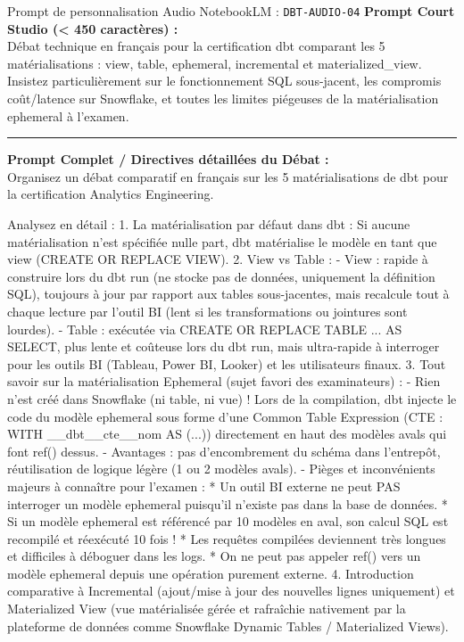 \documentclass[11pt,a4paper]{article}
\begin{document}
\begin{promptbox}{Prompt de personnalisation Audio NotebookLM : \texttt{DBT-AUDIO-04}}
\textbf{Prompt Court Studio (< 450 caractères) :}\\
Débat technique en français pour la certification dbt comparant les 5 matérialisations : view, table, ephemeral, incremental et materialized\_view. Insistez particulièrement sur le fonctionnement SQL sous-jacent, les compromis coût/latence sur Snowflake, et toutes les limites piégeuses de la matérialisation ephemeral à l'examen.

\medskip\hrule\medskip
\textbf{Prompt Complet / Directives détaillées du Débat :}\\
Organisez un débat comparatif en français sur les 5 matérialisations de dbt pour la certification Analytics Engineering.

Analysez en détail :
1. La matérialisation par défaut dans dbt :
Si aucune matérialisation n'est spécifiée nulle part, dbt matérialise le modèle en tant que view (CREATE OR REPLACE VIEW).
2. View vs Table :
- View : rapide à construire lors du dbt run (ne stocke pas de données, uniquement la définition SQL), toujours à jour par rapport aux tables sous-jacentes, mais recalcule tout à chaque lecture par l'outil BI (lent si les transformations ou jointures sont lourdes).
- Table : exécutée via CREATE OR REPLACE TABLE ... AS SELECT, plus lente et coûteuse lors du dbt run, mais ultra-rapide à interroger pour les outils BI (Tableau, Power BI, Looker) et les utilisateurs finaux.
3. Tout savoir sur la matérialisation Ephemeral (sujet favori des examinateurs) :
- Rien n'est créé dans Snowflake (ni table, ni vue) ! Lors de la compilation, dbt injecte le code du modèle ephemeral sous forme d'une Common Table Expression (CTE : WITH \_\_dbt\_\_cte\_\_nom AS (...)) directement en haut des modèles avals qui font ref() dessus.
- Avantages : pas d'encombrement du schéma dans l'entrepôt, réutilisation de logique légère (1 ou 2 modèles avals).
- Pièges et inconvénients majeurs à connaître pour l'examen :
  * Un outil BI externe ne peut PAS interroger un modèle ephemeral puisqu'il n'existe pas dans la base de données.
  * Si un modèle ephemeral est référencé par 10 modèles en aval, son calcul SQL est recompilé et réexécuté 10 fois !
  * Les requêtes compilées deviennent très longues et difficiles à déboguer dans les logs.
  * On ne peut pas appeler ref() vers un modèle ephemeral depuis une opération purement externe.
4. Introduction comparative à Incremental (ajout/mise à jour des nouvelles lignes uniquement) et Materialized View (vue matérialisée gérée et rafraîchie nativement par la plateforme de données comme Snowflake Dynamic Tables / Materialized Views).
\end{promptbox}
\end{document}
